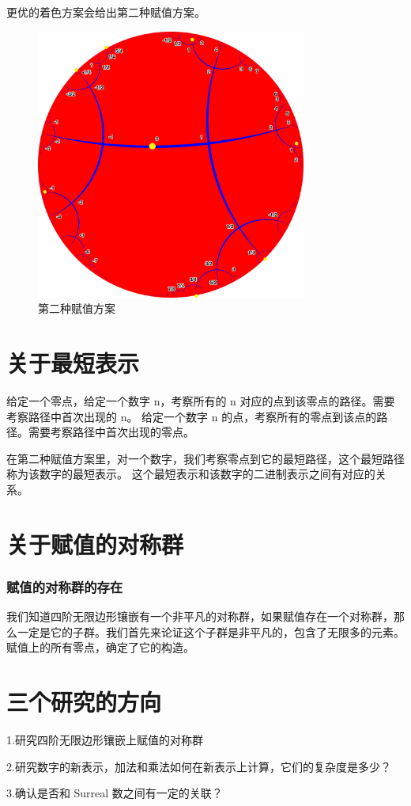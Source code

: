 \documentclass[a4paper,12pt]{article}
\begin{document}
更优的着色方案会给出第二种赋值方案。

\begin{figure}[ht]
\centering
\includegraphics[width=3.5in]{images/H2_tiling_with_assign_2.png}
\caption{第二种赋值方案}
\end{figure}

\section{关于最短表示}

给定一个零点，给定一个数字 n，考察所有的 n 对应的点到该零点的路径。需要考察路径中首次出现的 n。
给定一个数字 n 的点，考察所有的零点到该点的路径。需要考察路径中首次出现的零点。

在第二种赋值方案里，对一个数字，我们考察零点到它的最短路径，这个最短路径称为该数字的最短表示。
这个最短表示和该数字的二进制表示之间有对应的关系。

\section{关于赋值的对称群}

\subsubsection{赋值的对称群的存在}

我们知道四阶无限边形镶嵌有一个非平凡的对称群，如果赋值存在一个对称群，那么一定是它的子群。我们首先来论证这个子群是非平凡的，包含了无限多的元素。
赋值上的所有零点，确定了它的构造。


\section{三个研究的方向}

1.研究四阶无限边形镶嵌上赋值的对称群

2.研究数字的新表示，加法和乘法如何在新表示上计算，它们的复杂度是多少？

3.确认是否和 Surreal 数之间有一定的关联？
\end{document}
